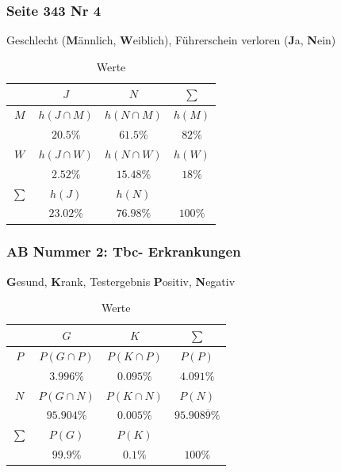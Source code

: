 \documentclass[a4paper,12pt]{article}
\begin{document}
\subsubsection*{Seite 343 Nr 4}
Geschlecht (\textbf{M}ännlich, \textbf{W}eiblich), Führerschein verloren (\textbf{J}a, \textbf{N}ein)
\begin{table}[h!]
  \begin{center}
    \caption{Werte}
    \label{tab:table1}
    \begin{tabular}{c|c|c|c} %
      \textbf{} & \textbf{$J$} & \textbf{$N$} & \textbf{$\sum$}\\
      \hline
      $M$ & $h(J \cap M)$ & $h(N \cap M)$ & $h(M)$\\
       & $20.5\%$ & $61.5 \%$ & $82 \%$\\
      \hline
      $W$ & $h(J \cap W)$ & $h(N \cap W)$ & $h(W)$\\
       & $2.52 \%$ & $15.48 \%$ & $18 \%$\\
      \hline
      $\sum$ & $h(J)$ & $h(N)$ & \\
       & $23.02 \%$ & $76.98 \%$ & $100 \%$\\
    \end{tabular}
  \end{center}
\end{table}
\subsubsection*{AB Nummer 2: Tbc- Erkrankungen}
\textbf{G}esund, \textbf{K}rank, Testergebnis \textbf{P}ositiv, \textbf{N}egativ
\begin{table}[h!]
  \begin{center}
    \caption{Werte}
    \label{tab:table1}
    \begin{tabular}{c|c|c|c} %
      \textbf{} & \textbf{$G$} & \textbf{$K$} & \textbf{$\sum$}\\
      \hline
      $P$ & $P(G \cap P)$ & $P(K \cap P)$ & $P(P)$\\
       & $3.996\%$ & $0.095 \%$ & $4.091 \%$\\
      \hline
      $N$ & $P(G \cap N)$ & $P(K \cap N)$ & $P(N)$\\
       & $95.904 \%$ & $0.005 \%$ & $95.908\overline{9} \%$\\
      \hline
      $\sum$ & $P(G)$ & $P(K)$ & \\
       & $99.9 \%$ & $0.1 \%$ & $100 \%$\\
    \end{tabular}
  \end{center}
\end{table}
\pagebreak
\end{document}

